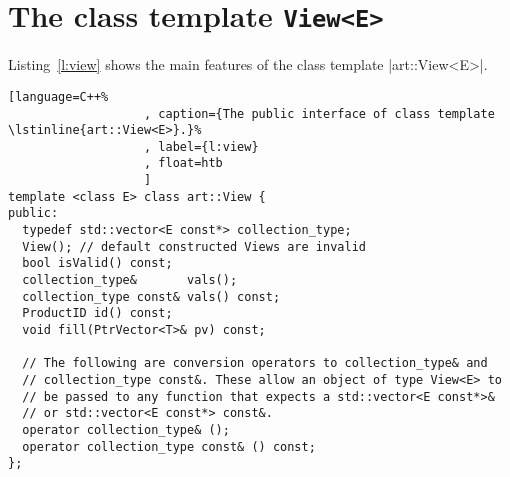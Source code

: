 \documentclass[letterpaper,10pt,article]{memoir}
\begin{document}
\chapter{The class template \lstinline{View<E>}\label{ch:view-template}}

Listing~\ref{l:view} shows the main features of the class template |art::View<E>|.

\begin{lstlisting}[language=C++%
                   , caption={The public interface of class template \lstinline{art::View<E>}.}%
                   , label={l:view}
                   , float=htb
                   ]
template <class E> class art::View {
public:
  typedef std::vector<E const*> collection_type;
  View(); // default constructed Views are invalid
  bool isValid() const;
  collection_type&       vals();
  collection_type const& vals() const;
  ProductID id() const;
  void fill(PtrVector<T>& pv) const;

  // The following are conversion operators to collection_type& and
  // collection_type const&. These allow an object of type View<E> to
  // be passed to any function that expects a std::vector<E const*>&
  // or std::vector<E const*> const&.
  operator collection_type& ();
  operator collection_type const& () const;
};
\end{lstlisting}
\end{document}
